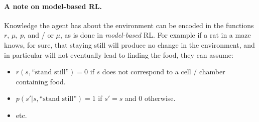 \documentclass[10pt,letterpaper]{article}
\newtheorem{remark}{Remark}
\begin{document}

\paragraph{A note on model-based RL.}
Knowledge the agent has about the environment can be encoded in the
functions $r$, $\mu$, $p$, and / or $\mu$, as is done in
\textit{model-based} RL. For example if a rat in a maze knows, for sure,
that staying still will produce no change in the environment, and in particular will not eventually lead to finding the food, they can assume:
\begin{itemize}
\item $r(s, \text{``stand still''}) = 0$ if $s$ does not correspond to a cell / chamber containing food.
\item $p(s'|s,\text{``stand still''}) = 1$ if $s'=s$ and $0$ otherwise.
\item etc.
\end{itemize}
\end{document}
